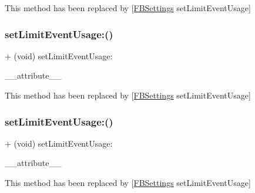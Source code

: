 This method has been replaced by \mbox{[}\hyperlink{interfaceFBSettings}{F\+B\+Settings} set\+Limit\+Event\+Usage\mbox{]} \mbox{\label{interfaceFBAppEvents_a35ba571c101d4c2a051583f59ad433ab}} 
\subsubsection{\texorpdfstring{set\+Limit\+Event\+Usage\+:()}{setLimitEventUsage:()}\hspace{0.1cm}{\footnotesize\ttfamily [3/5]}}
{\footnotesize\ttfamily + (void) set\+Limit\+Event\+Usage\+: \begin{DoxyParamCaption}\item[{((deprecated(\char`\"{}use \mbox{[}\hyperlink{interfaceFBSettings}{F\+B\+Settings} set\+Limit\+Event\+And\+Data\+Usage\mbox{]} instead\char`\"{})))}]{\+\_\+\+\_\+attribute\+\_\+\+\_\+ }\end{DoxyParamCaption}}

This method has been replaced by \mbox{[}\hyperlink{interfaceFBSettings}{F\+B\+Settings} set\+Limit\+Event\+Usage\mbox{]} \mbox{\label{interfaceFBAppEvents_a35ba571c101d4c2a051583f59ad433ab}} 
\subsubsection{\texorpdfstring{set\+Limit\+Event\+Usage\+:()}{setLimitEventUsage:()}\hspace{0.1cm}{\footnotesize\ttfamily [4/5]}}
{\footnotesize\ttfamily + (void) set\+Limit\+Event\+Usage\+: \begin{DoxyParamCaption}\item[{((deprecated(\char`\"{}use \mbox{[}\hyperlink{interfaceFBSettings}{F\+B\+Settings} set\+Limit\+Event\+And\+Data\+Usage\mbox{]} instead\char`\"{})))}]{\+\_\+\+\_\+attribute\+\_\+\+\_\+ }\end{DoxyParamCaption}}

This method has been replaced by \mbox{[}\hyperlink{interfaceFBSettings}{F\+B\+Settings} set\+Limit\+Event\+Usage\mbox{]} \mbox{\label{interfaceFBAppEvents_a35ba571c101d4c2a051583f59ad433ab}} 
